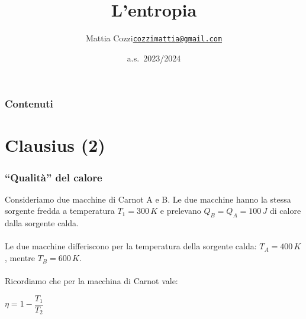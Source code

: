 \documentclass[]{beamer}
\title{L'entropia}
\author{\texorpdfstring{Mattia Cozzi\newline\href{mailto:cozzimattia@gmail.com}{\texttt{cozzimattia@gmail.com}}}{Mattia Cozzi}}
\date{a.s.~2023/2024}
\theoremstyle{plain}
\begin{document}
\begin{frame}
  \titlepage
\end{frame}





\begin{frame}
\frametitle{Contenuti}
\tableofcontents
\end{frame}


\section{Clausius (2)}

\begin{frame}
\frametitle{``Qualità'' del calore}
Consideriamo due macchine di Carnot A e B.{\pause} Le due macchine hanno la \alert<2>{stessa sorgente fredda} a temperatura $ T_1 = 300 \, K $ e prelevano $ Q_B = Q_A = 100 \, J $ di calore dalla sorgente calda.\pause
\\~\\
Le due macchine differiscono per la \alert<3>{temperatura della sorgente calda}: $ T_A = 400 \, K $, mentre $ T_B = 600 \, K $.
\\~\\\pause
Ricordiamo che per la macchina di Carnot vale:
\begin{center}
\colorbox{blue!30}{$ \eta = 1 - \dfrac{T_1}{T_2} $}
\end{center}
\end{frame}
\end{document}
